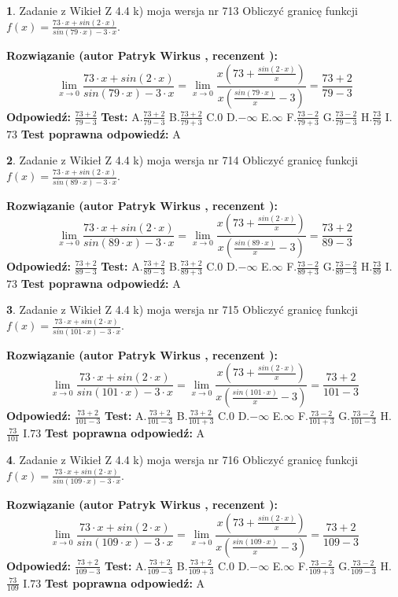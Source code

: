 \documentclass[12pt, a4paper]{article}
\theoremstyle{definition} %
\newtheorem{zad}{}
\newcommand{\zadStart}[1]{\begin{zad}#1\newline}
\newcommand{\zadStop}{\end{zad}}
\newcommand{\rozwStart}[2]{\noindent \textbf{Rozwiązanie (autor #1 , recenzent #2): }\newline}
\newcommand{\rozwStop}{\newline}
\newcommand{\odpStart}{\noindent \textbf{Odpowiedź:}\newline}
\newcommand{\odpStop}{\newline}
\newcommand{\testStart}{\noindent \textbf{Test:}\newline}
\newcommand{\testStop}{\newline}
\newcommand{\kluczStart}{\noindent \textbf{Test poprawna odpowiedź:}\newline}
\newcommand{\kluczStop}{\newline}
\begin{document}
\zadStart{Zadanie z Wikieł Z 4.4 k) moja wersja nr 713}
Obliczyć granicę funkcji $f(x)=\frac{73\cdot x +sin(2\cdot x)}{sin(79\cdot x) -3\cdot x}$.
\zadStop
\rozwStart{Patryk Wirkus}{}
$$\lim\limits_{x\to 0}\frac{73\cdot x +sin(2\cdot x)}{sin(79\cdot x) -3\cdot x}
=\lim\limits_{x\to 0}\frac{x(73+\frac{sin(2\cdot x)}{x})}{x(\frac{sin(79\cdot x)}{x}-3)}
=\frac{73+2}{79-3}$$
\rozwStop
\odpStart
$\frac{73+2}{79-3}$
\odpStop
\testStart
A.$\frac{73+2}{79-3}$
B.$\frac{73+2}{79+3}$
C.$0$
D.$-\infty$
E.$\infty$
F.$\frac{73-2}{79+3}$
G.$\frac{73-2}{79-3}$
H.$\frac{73}{79}$
I.$73$
\testStop
\kluczStart
A
\kluczStop



\zadStart{Zadanie z Wikieł Z 4.4 k) moja wersja nr 714}
Obliczyć granicę funkcji $f(x)=\frac{73\cdot x +sin(2\cdot x)}{sin(89\cdot x) -3\cdot x}$.
\zadStop
\rozwStart{Patryk Wirkus}{}
$$\lim\limits_{x\to 0}\frac{73\cdot x +sin(2\cdot x)}{sin(89\cdot x) -3\cdot x}
=\lim\limits_{x\to 0}\frac{x(73+\frac{sin(2\cdot x)}{x})}{x(\frac{sin(89\cdot x)}{x}-3)}
=\frac{73+2}{89-3}$$
\rozwStop
\odpStart
$\frac{73+2}{89-3}$
\odpStop
\testStart
A.$\frac{73+2}{89-3}$
B.$\frac{73+2}{89+3}$
C.$0$
D.$-\infty$
E.$\infty$
F.$\frac{73-2}{89+3}$
G.$\frac{73-2}{89-3}$
H.$\frac{73}{89}$
I.$73$
\testStop
\kluczStart
A
\kluczStop



\zadStart{Zadanie z Wikieł Z 4.4 k) moja wersja nr 715}
Obliczyć granicę funkcji $f(x)=\frac{73\cdot x +sin(2\cdot x)}{sin(101\cdot x) -3\cdot x}$.
\zadStop
\rozwStart{Patryk Wirkus}{}
$$\lim\limits_{x\to 0}\frac{73\cdot x +sin(2\cdot x)}{sin(101\cdot x) -3\cdot x}
=\lim\limits_{x\to 0}\frac{x(73+\frac{sin(2\cdot x)}{x})}{x(\frac{sin(101\cdot x)}{x}-3)}
=\frac{73+2}{101-3}$$
\rozwStop
\odpStart
$\frac{73+2}{101-3}$
\odpStop
\testStart
A.$\frac{73+2}{101-3}$
B.$\frac{73+2}{101+3}$
C.$0$
D.$-\infty$
E.$\infty$
F.$\frac{73-2}{101+3}$
G.$\frac{73-2}{101-3}$
H.$\frac{73}{101}$
I.$73$
\testStop
\kluczStart
A
\kluczStop



\zadStart{Zadanie z Wikieł Z 4.4 k) moja wersja nr 716}
Obliczyć granicę funkcji $f(x)=\frac{73\cdot x +sin(2\cdot x)}{sin(109\cdot x) -3\cdot x}$.
\zadStop
\rozwStart{Patryk Wirkus}{}
$$\lim\limits_{x\to 0}\frac{73\cdot x +sin(2\cdot x)}{sin(109\cdot x) -3\cdot x}
=\lim\limits_{x\to 0}\frac{x(73+\frac{sin(2\cdot x)}{x})}{x(\frac{sin(109\cdot x)}{x}-3)}
=\frac{73+2}{109-3}$$
\rozwStop
\odpStart
$\frac{73+2}{109-3}$
\odpStop
\testStart
A.$\frac{73+2}{109-3}$
B.$\frac{73+2}{109+3}$
C.$0$
D.$-\infty$
E.$\infty$
F.$\frac{73-2}{109+3}$
G.$\frac{73-2}{109-3}$
H.$\frac{73}{109}$
I.$73$
\testStop
\kluczStart
A
\kluczStop
\end{document}
